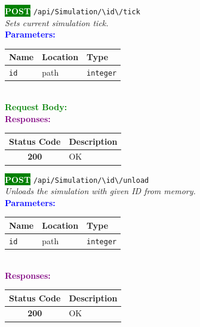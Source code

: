 \begin{tcolorbox}[
    colback=green!5,
    colframe=green,
    arc=2mm,
    boxrule=1pt,
    left=5pt,
    right=5pt,
    top=5pt,
    bottom=5pt
]
\noindent\colorbox{green}{\textcolor{white}{\textbf{POST}}} 
\texttt{\large /api/Simulation/\textbackslash{}{id\textbackslash{}}/tick}\\[0.3em]
\textit{Sets current simulation tick.}\\[0.3em]
\vspace{0.3em}
\textbf{\textcolor{blue}{Parameters:}}\\[0.2em]
\begin{tabular}{|l|l|l|}
\hline
\rowcolor{gray!20}
\textbf{Name} & \textbf{Location} & \textbf{Type} \\ \hline
\texttt{id} & path & \texttt{integer} \\ \hline
\end{tabular}\\[0.5em]
\vspace{0.3em}
\textbf{\textcolor{green}{Request Body:}}\\[0.2em]
\vspace{0.3em}
\textbf{\textcolor{purple}{Responses:}}\\[0.2em]
\begin{tabular}{|c|p{10cm}|}
\hline
\rowcolor{gray!20}
\textbf{Status Code} & \textbf{Description} \\ \hline
\colorbox{green!20}{\textbf{200}} & OK \\ \hline
\end{tabular}
\end{tcolorbox}
\vspace{0.5em}

\begin{tcolorbox}[
    colback=green!5,
    colframe=green,
    arc=2mm,
    boxrule=1pt,
    left=5pt,
    right=5pt,
    top=5pt,
    bottom=5pt
]
\noindent\colorbox{green}{\textcolor{white}{\textbf{POST}}} 
\texttt{\large /api/Simulation/\textbackslash{}{id\textbackslash{}}/unload}\\[0.3em]
\textit{Unloads the simulation with given ID from memory.}\\[0.3em]
\vspace{0.3em}
\textbf{\textcolor{blue}{Parameters:}}\\[0.2em]
\begin{tabular}{|l|l|l|}
\hline
\rowcolor{gray!20}
\textbf{Name} & \textbf{Location} & \textbf{Type} \\ \hline
\texttt{id} & path & \texttt{integer} \\ \hline
\end{tabular}\\[0.5em]
\vspace{0.3em}
\textbf{\textcolor{purple}{Responses:}}\\[0.2em]
\begin{tabular}{|c|p{10cm}|}
\hline
\rowcolor{gray!20}
\textbf{Status Code} & \textbf{Description} \\ \hline
\colorbox{green!20}{\textbf{200}} & OK \\ \hline
\end{tabular}
\end{tcolorbox}
\vspace{0.5em}
